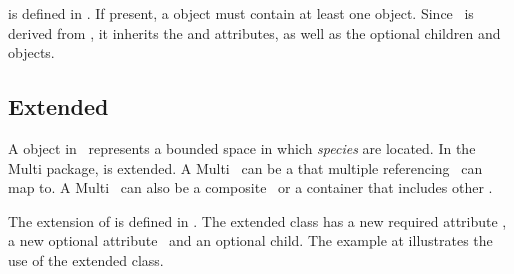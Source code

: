 \subsubsection{}
\label{def:ListOfSpeciesTypes}

 is defined in . If present, a \ListOfSpeciesTypes object must contain at least one \SpeciesType object.  Since \ListOfSpeciesTypes\ is derived from , it inherits the  and  attributes, as well as the optional children  and  objects. 

\clearpage

\subsection{Extended }
\label{def:Compartment}

A \Compartment object in \SbmlLevelThreeCore\ represents a bounded space in which \textit{species} are located. In the Multi package, \Compartment is extended. A Multi \compartment\ can be a  that multiple referencing \compartments\ can map to. A Multi \compartment\ can also be a composite \compartment\ or a container that includes other \compartments.

The extension of  is defined in . The extended \Compartment class has a new required attribute \isTypeAtt, a new optional attribute \compartmentTypeAtt\ and an optional \ListOfCompartmentReferences child. The example at  illustrates the use of the extended \Compartment class.

